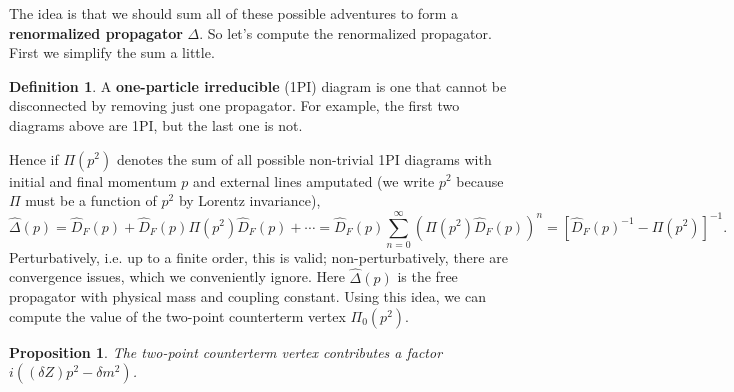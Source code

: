 \documentclass{report}
\theoremstyle{plain}
\newtheorem{proposition}[theorem]{Proposition}
\theoremstyle{definition}
\newtheorem{definition}[theorem]{Definition}
\theoremstyle{remark}
\begin{document}
\begin{center}
\begin{minipage}{0.3\textwidth}
  \end{minipage}
\end{center}
The idea is that we should sum all of these possible adventures to
form a {\bf renormalized propagator} $\Delta$. So let's compute the
renormalized propagator. First we simplify the sum a little.

\begin{definition}
  A {\bf one-particle irreducible} (1PI) diagram is one that cannot be
  disconnected by removing just one propagator. For example, the first
  two diagrams above are 1PI, but the last one is not.
\end{definition}

Hence if $\Pi(p^2)$ denotes the sum of all possible non-trivial 1PI
diagrams with initial and final momentum $p$ and external lines
amputated (we write $p^2$ because $\Pi$ must be a function of $p^2$ by
Lorentz invariance),
$$ \widehat{\Delta}(p) = \widehat{D}_F(p) + \widehat{D}_F(p)\Pi(p^2)\widehat{D}_F(p) + \cdots = \widehat{D}_F(p) \sum_{n=0}^\infty (\Pi(p^2)\widehat{D}_F(p))^n = [\widehat{D}_F(p)^{-1} - \Pi(p^2)]^{-1}. $$
Perturbatively, i.e. up to a finite order, this is valid;
non-perturbatively, there are convergence issues, which we
conveniently ignore. Here $\widehat{\Delta}(p)$ is the free propagator
with physical mass and coupling constant. Using this idea, we can
compute the value of the two-point counterterm vertex $\Pi_0(p^2)$.

\begin{proposition}
  The two-point counterterm vertex contributes a factor
  $i((\delta Z)p^2 - \delta m^2)$.
\end{proposition}
\end{document}
